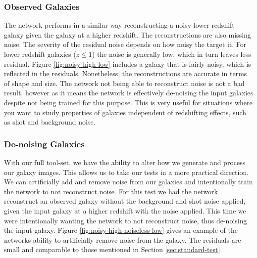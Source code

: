 \documentclass[fleqn,usenatbib]{mnras}
\begin{document}
\subsubsection{Observed Galaxies} \label{sec:observed-test2}
The network performs in a similar way reconstructing a noisy lower redshift galaxy given the galaxy at a higher redshift. The reconstructions are also missing noise. The severity of the residual noise depends on how noisy the target it. For lower redshift galaxies ($z \leq 1$) the noise is generally low, which in turn leaves less residual. Figure \ref{fig:noisy-high-low} includes a galaxy that is fairly noisy, which is reflected in the residuals. Nonetheless, the reconstructions are accurate in terms of shape and size. The network not being able to reconstruct noise is not a bad result, however as it means the network is effectively de-noising the input galaxies despite not being trained for this purpose. This is very useful for situations where you want to study properties of galaxies independent of redshifting effects, such as shot and background noise.

\subsubsection{De-noising Galaxies} \label{sec:de-noise-test}
With our full tool-set, we have the ability to alter how we generate and process our galaxy images. This allows us to take our tests in a more practical direction. We can artificially add and remove noise from our galaxies and intentionally train the network to not reconstruct noise. For this test we had the network reconstruct an observed galaxy without the background and shot noise applied, given the input galaxy at a higher redshift with the noise applied. This time we were intentionally wanting the network to not reconstruct noise, thus de-noising the input galaxy. Figure \ref{fig:noisy-high-noiseless-low} gives an example of the networks ability to artificially remove noise from the galaxy. The residuals are small and comparable to those mentioned in Section \ref{sec:standard-test}.
\end{document}
